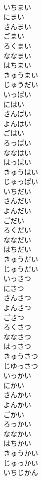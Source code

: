 \documentclass[8pt]{extreport}
\begin{document}
\begin{CJK}{UTF8}{min}
\\	いちまい	
\\	にまい	
\\	さんまい	
\\	ごまい	
\\	ろくまい	
\\	ななまい	
\\	はちまい	
\\	きゅうまい	
\\	じゅうだい	
\\	いっぱい	
\\	にはい	
\\	さんばい	
\\	よんはい	
\\	ごはい	
\\	ろっぱい	
\\	ななはい	
\\	はっぱい	
\\	きゅうはい	
\\	じゅっぱい	
\\	いちだい	
\\	さんだい	
\\	よんだい	
\\	ごだい	
\\	ろくだい	
\\	ななだい	
\\	はちだい	
\\	きゅうだい	
\\	じゅうだい	
\\	いっさつ	
\\	にさつ	
\\	さんさつ	
\\	よんさつ	
\\	ごさつ	
\\	ろくさつ	
\\	ななさつ	
\\	はっさつ	
\\	きゅうさつ	
\\	じゆっさつ	
\\	いっかい	
\\	にかい	
\\	さんかい	
\\	よんかい	
\\	ごかい	
\\	ろっかい	
\\	ななかい	
\\	はちかい	
\\	きゅうかい	
\\	じゅっかい	
\\	いちじかん	

\end{CJK}
\end{document}
